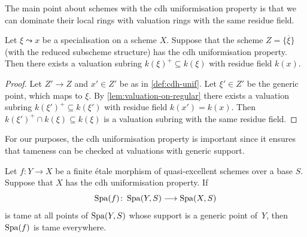 The main point about schemes with the cdh uniformisation property is that we can dominate their local rings with valuation rings with the same residue field.

\begin{lem} \label{lem:valuation-on-cdh-unif}
    Let $\xi\leadsto x$ be a specialisation on a scheme $X$. Suppose that the scheme $Z = \overline{\{\xi\}}$ (with the reduced subscheme structure) has the cdh uniformisation property. Then there exists a valuation subring $k(\xi)^+\subseteq k(\xi)$ with residue field $k(x)$. 
\end{lem}

\begin{proof}
Let $Z'\to Z$ and $x'\in Z'$ be as in \cref{def:cdh-unif}. Let $\xi'\in Z'$ be the generic point, which maps to $\xi$. By \cref{lem:valuation-on-regular} there exists a valuation subring $k(\xi')^+\subseteq k(\xi')$ with residue field $k(x')=k(x)$. Then $k(\xi')^+\cap k(\xi)\subseteq k(\xi)$ is a valuation subring with the same residue field. 
\end{proof}

For our purposes, the cdh uniformisation property is important since it ensures that tameness can be checked at valuations with generic support.

\begin{lem}  \label{tameness-support-generic-point}
    Let $f\colon Y\to X$ be a finite \'etale  morphism of quasi-excellent schemes over a base $S$. Suppose that $X$ has the cdh uniformisation property. If 
    \[
        \operatorname{Spa}(f) \colon \operatorname{Spa}(Y,S) \longrightarrow \operatorname{Spa}(X,S)
    \]
    is tame at all points of $\operatorname{Spa}(Y,S)$ whose support is a generic point of~$Y$, then $\operatorname{Spa}(f)$ is tame everywhere.
\end{lem}

